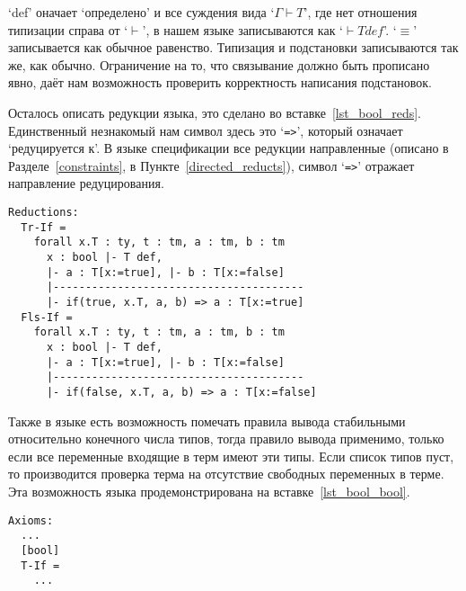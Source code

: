 `def' оначает `определено' и все суждения вида `$\Gamma \vdash T$', где нет отношения типизации справа от `$\vdash$', в нашем языке записываются как `$ \vdash T def$'. `$\equiv$' записывается как обычное равенство. Типизация и подстановки записываются так же, как обычно. Ограничение на то, что связывание должно быть прописано явно, даёт нам возможность проверить корректность написания подстановок.

Осталось описать редукции языка, это сделано во вставке~\ref{lst_bool_reds}. Единственный незнакомый нам символ здесь это `\lstinline{=>}', который означает `редуцируется к'. В языке спецификации все редукции направленные (описано в Разделе~\ref{constraints}, в Пункте~\ref{directed_reducts}), символ `\lstinline{=>}' отражает направление редуцирования.

\begin{lstlisting}[label={lst_bool_reds}, caption={Редукции языка Bool, описанные в языке спецификации},captionpos=b, frame=single, float]
Reductions:
  Tr-If =
    forall x.T : ty, t : tm, a : tm, b : tm
      x : bool |- T def,
      |- a : T[x:=true], |- b : T[x:=false]
      |---------------------------------------
      |- if(true, x.T, a, b) => a : T[x:=true]
  Fls-If =
    forall x.T : ty, t : tm, a : tm, b : tm
      x : bool |- T def,
      |- a : T[x:=true], |- b : T[x:=false]
      |---------------------------------------
      |- if(false, x.T, a, b) => a : T[x:=false]
\end{lstlisting}

Также в языке есть возможность помечать правила вывода стабильными относительно конечного числа типов, тогда правило вывода применимо, только если все переменные входящие в терм имеют эти типы. Если список типов пуст, то производится проверка терма на отсутствие свободных переменных в терме. Эта возможность языка продемонстрирована на вставке~\ref{lst_bool_bool}.

\begin{lstlisting}[label={lst_bool_bool}, caption={Bool-стабильность правила вывода `If', описанная в языке спецификации},captionpos=b, frame=single, float]
Axioms:
  ...
  [bool]
  T-If =
    ...
\end{lstlisting}
